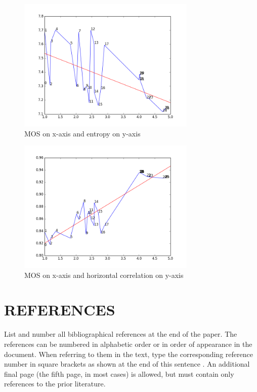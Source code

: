 \documentclass{article}
\begin{document}
\begin{figure}[ht]
  \centering
  \includegraphics[width=8.5cm]{figures/mos_entropy}
  \caption{MOS on x-axis and entropy on y-axis\label{fig:entropy} }
\end{figure}
\begin{figure}[ht]
  \centering
  \includegraphics[width=8.5cm]{figures/mos_corr_horiz}
  \caption{MOS on x-axis and horizontal correlation on y-axis\label{fig:correlation} }
\end{figure}
\section{REFERENCES}
\label{sec:ref}

List and number all bibliographical references at the end of the
paper. The references can be numbered in alphabetic order or in
order of appearance in the document. When referring to them in
the text, type the corresponding reference number in square
brackets as shown at the end of this sentence \cite{C2}. An
additional final page (the fifth page, in most cases) is
allowed, but must contain only references to the prior
literature.



\end{document}
